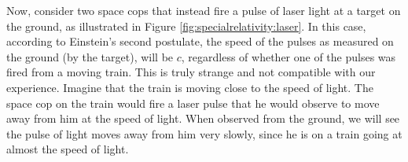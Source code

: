 Now, consider two space cops that instead fire a pulse of laser light at a target on the ground, as illustrated in Figure \ref{fig:specialrelativity:laser}. 
In this case, according to Einstein's second postulate, the speed of the pulses as measured on the ground (by the target), will be $c$, regardless of whether one of the pulses was fired from a moving train. This is truly strange and not compatible with our experience. Imagine that the train is moving close to the speed of light. The space cop on the train would fire a laser pulse that he would observe to move away from him at the speed of light. When observed from the ground, we will see the pulse of light moves away from him very slowly, since he is on a train going at almost the speed of light. 

